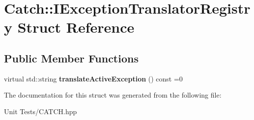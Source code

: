 \hypertarget{structCatch_1_1IExceptionTranslatorRegistry}{}\section{Catch\+:\+:I\+Exception\+Translator\+Registry Struct Reference}
\label{structCatch_1_1IExceptionTranslatorRegistry}
\subsection*{Public Member Functions}
\begin{DoxyCompactItemize}
\item 
virtual std\+::string {\bfseries translate\+Active\+Exception} () const =0\hypertarget{structCatch_1_1IExceptionTranslatorRegistry_af76ae8c331a17f2a94c9720bc0d686bb}{}\label{structCatch_1_1IExceptionTranslatorRegistry_af76ae8c331a17f2a94c9720bc0d686bb}

\end{DoxyCompactItemize}


The documentation for this struct was generated from the following file\+:\begin{DoxyCompactItemize}
\item 
Unit Tests/C\+A\+T\+C\+H.\+hpp\end{DoxyCompactItemize}
